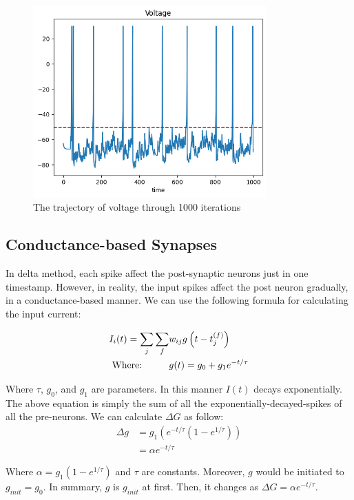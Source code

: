 \documentclass{article}
\begin{document}
	\begin{figure}[h]
		\includegraphics[width=0.8\textwidth]{voltage1.png}
		\caption{The trajectory of voltage through 1000 iterations}
		\label{diracVol}
	\end{figure}
	
	\subsection{Conductance-based Synapses}
	In delta method, each spike affect the post-synaptic neurons just in one timestamp. However, in reality, the input spikes affect the post neuron gradually, in a conductance-based manner. We can use the following formula for calculating the input current:
	
	\begin{align*}
		I_i(t) = \sum_{j} \sum_{f} &w_{ij}g\left( t-t_j^{(f)}\right)\\
		\text{Where:}\hspace*{1cm} &g(t) = g_0 + g_1 e^{-t/\tau}
	\end{align*}
	
	Where $\tau$, $g_0$, and $g_1$ are parameters. In this manner $I(t)$ decays exponentially. The above equation is simply the sum of all the exponentially-decayed-spikes of all the pre-neurons. We can calculate $\Delta G$ as follow:\\
	\begin{align*}
		\Delta g &= g_1(e^{-t/\tau} (1 - e^{1/\tau}))\\
		&= \alpha e^{-t/\tau} 
	\end{align*}
	
	Where $\alpha = g_1 (1 - e^{1/\tau})$ and $\tau$ are constants. Moreover, $g$ would be initiated to $g_{init} = g_0$. In summary, $g$ is $g_{init}$ at first. Then, it changes as $\Delta G = \alpha e^{-t/\tau}$.\\
\end{document}
